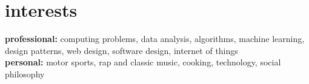 \documentclass[]{friggeri-cv} %
\begin{document}
\begin{minipage}[t]{0.5\linewidth}
\begin{flushright}
 \end{flushright}

\end{minipage}\par\bigskip


\section{interests}

\textbf{professional:} computing problems, data analysis, algorithms, machine learning, design patterns, web design, software design, internet of things \\
\textbf{personal:} motor sports, rap and classic music, cooking, technology, social philosophy
\end{document}
